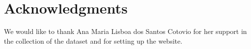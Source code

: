 \section*{Acknowledgments}

We would like to thank Ana Maria Lisboa dos Santos Cotovio for her support in the collection of the dataset and for setting up the website. 

